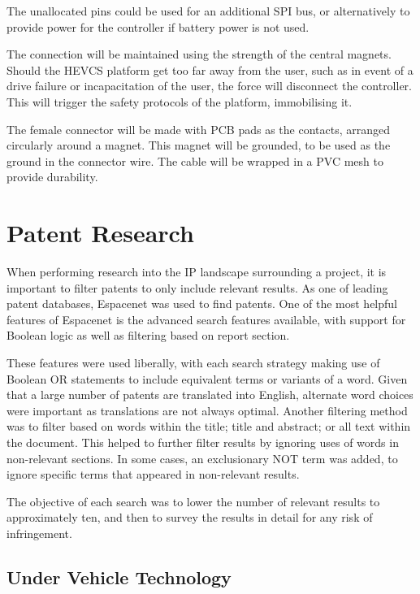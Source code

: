 \documentclass [12pt]{article}
\begin{document}
The unallocated pins could be used for an additional SPI bus, or alternatively to provide power for the controller if battery power is not used.

The connection will be maintained using the strength of the central magnets. Should the HEVCS platform get too far away from the user, such as in event of a drive failure or incapacitation of the user, the force will disconnect the controller. This will trigger the safety protocols of the platform, immobilising it.

The female connector will be made with PCB pads as the contacts, arranged circularly around a magnet. This magnet will be grounded, to be used as the ground in the connector wire. The cable will be wrapped in a PVC mesh to provide durability.

\section{Patent Research}\label{sec:patent_research}
When performing research into the IP landscape surrounding a project, it is important to filter patents to only include relevant results. As one of leading patent databases, Espacenet was used to find patents. One of the most helpful features of Espacenet is the advanced search features available, with support for Boolean logic as well as filtering based on report section.

These features were used liberally, with each search strategy making use of Boolean OR statements to include equivalent terms or variants of a word. Given that a large number of patents are translated into English, alternate word choices were important as translations are not always optimal. Another filtering method was to filter based on words within the title; title and abstract; or all text within the document. This helped to further filter results by ignoring uses of words in non-relevant sections. In some cases, an exclusionary NOT term was added, to ignore specific terms that appeared in non-relevant results.

The objective of each search was to lower the number of relevant results to approximately ten, and then to survey the results in detail for any risk of infringement.

\subsection{Under Vehicle Technology}\label{sec:under_vehilce_technology}
\end{document}
